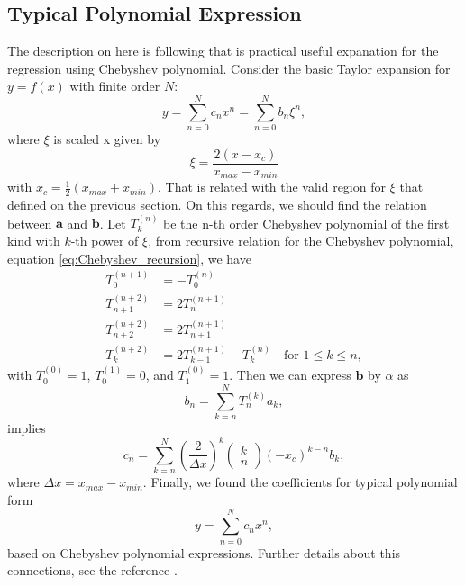 \message{ !name(brief_Brownian_dynamics.tex)}\documentclass[10pt, a4paper]{report}
\begin{document}
\begin{appendices}
  \section{Typical Polynomial Expression}
  The description on here is following \textcite{SooCho:2013bg} that is practical useful expanation for the regression using Chebyshev polynomial.
  Consider the basic Taylor expansion for $y=f(x)$ with finite order $N$:
  \begin{equation}
    y = \sum_{n=0}^{N} c_n x^n = \sum_{n=0}^{N} b_n\xi^n,
  \end{equation}
  where $\xi$ is scaled x given by
  \begin{equation}
    \xi = \frac{2(x - x_c)}{x_{max} - x_{min}}
  \end{equation}
  with $x_c = \frac{1}{2}(x_{max} + x_{min})$. That is related with the valid region for $\xi$ that defined on the previous section. On this regards, we should find the relation between $\mathbf{a}$ and $\mathbf{b}$.
  Let $T^{(n)}_{k}$ be the n-th order Chebyshev polynomial of the first kind with $k$-th power of $\xi$, from recursive relation for the Chebyshev polynomial, equation \eqref{eq:Chebyshev_recursion}, we have
  \begin{align}
    T_0^{(n+1)} &= -T_0^{(n)} \\
    T_{n+1}^{(n+2)} &= 2T_{n}^{(n+1)} \\
    T_{n+2}^{(n+2)} &= 2T_{n+1}^{(n+1)} \\
    T_k^{(n+2)} &= 2T_{k-1}^{(n+1)}-T_k^{(n)}\quad\textrm{for }1\leq k\leq n,
  \end{align}
  with $T_0^{(0)}=1$, $T_0^{(1)}=0$, and $T_1^{(0)} = 1$. Then we can express $\mathbf{b}$ by $\alpha$ as
  \begin{equation}
    b_n = \sum_{k=n}^{N}T_n^{(k)}a_k,
  \end{equation}
  implies
  \begin{equation}
    c_n = \sum_{k=n}^{N}\left(\frac{2}{\Delta x}\right)^k\left(\begin{array}{c} k \\ n \end{array}\right)\left(-x_c\right)^{k-n}b_k,
  \end{equation}
  where $\Delta x = x_{max} - x_{min}$.
  Finally, we found the coefficients for typical polynomial form
  \begin{equation}
    y = \sum_{n=0}^{N}c_nx^n,
  \end{equation}
  based on Chebyshev polynomial expressions.
  Further details about this connections, see the reference \textcite{SooCho:2013bg}.


\end{appendices}
\end{document}
